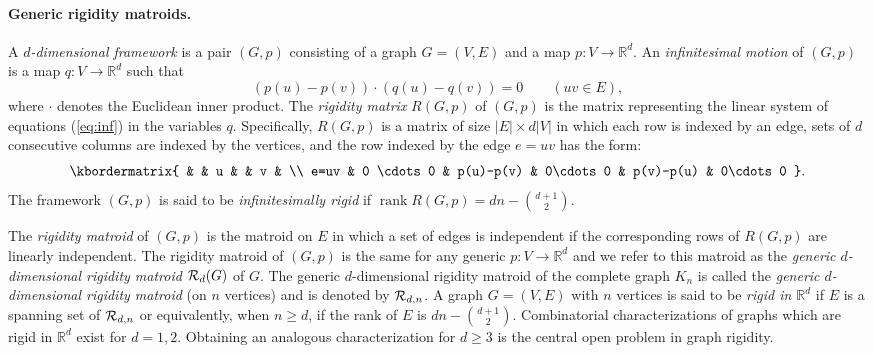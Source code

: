 \documentclass{daj}
\DeclareMathOperator{\rank}{rank}
\newcommand{\R}{\mathbb{R}}
\begin{document}
\paragraph{\boldmath Generic rigidity matroids.}%
A {\em $d$-dimensional framework} is a pair $(G,p)$ consisting of  a graph $G=(V,E)$ and a map $p:V\rightarrow \mathbb{R}^d$.
An {\em infinitesimal motion} of $(G,p)$ is a map $q:V\rightarrow \mathbb{R}^d$ such that
\begin{equation}\label{eq:inf}
(p(u)-p(v))\cdot (q(u)-q(v))=0 \qquad (uv\in E),
\end{equation}
where $\cdot$ denotes the Euclidean inner product.
The {\em rigidity matrix} $R(G,p)$ of $(G,p)$ is the matrix representing the  linear system  of equations (\ref{eq:inf}) in the variables $q$.
Specifically, $R(G,p)$ is a matrix of size $|E|\times d|V|$ in which each row is indexed by an edge, sets of $d$ consecutive columns are indexed by the vertices, and the row indexed by the  edge $e=uv$ has the form:
\[
\kbordermatrix{
  & &  u & & v & \\
 e=uv & 0 \cdots 0 & p(u)-p(v) & 0\cdots 0 & p(v)-p(u) & 0\cdots 0
}.
\]
The framework $(G,p)$ is said to be {\em infinitesimally rigid} if $\rank R(G,p)=dn-{d+1\choose 2}$.

The {\em rigidity matroid} of $(G,p)$ is the matroid on $E$ in which a set of edges is independent if the corresponding rows of $R(G,p)$ are linearly independent.
The rigidity matroid of $(G,p)$ is the same for any generic
$p:V\to \R^d$ and we refer to this matroid as
the {\em generic $d$-dimensional rigidity matroid} ${\cal R}_d(G)$ of $G$.
The generic $d$-dimensional rigidity matroid of the complete graph $K_n$ is called the {\em generic $d$-dimensional rigidity matroid} (on $n$ vertices) and is denoted by ${\cal R}_{d,n}$.
A graph $G=(V,E)$ with $n$ vertices is said to be {\em rigid in $\R^d$} if $E$ is a spanning set of ${\cal R}_{d,n}$
or equivalently, when $n\geq d$, if the rank of $E$ is $dn-{d+1\choose 2}$.
Combinatorial characterizations of graphs which are rigid in $\R^d$ exist for $d=1,2$. Obtaining an analogous characterization for $d\geq 3$ is
the central open problem in graph rigidity.
\end{document}
